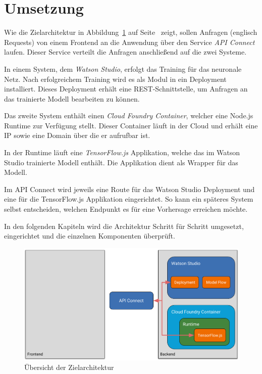 \section{Umsetzung}
Wie die Zielarchitektur in Abbildung~\ref{fig:umsetzung_zielarchitektur} auf
Seite~\pageref{fig:umsetzung_zielarchitektur} zeigt, sollen Anfragen (englisch Requests) von einem Frontend an die
Anwendung über den Service \textit{API Connect} laufen. Dieser Service verteilt die Anfragen anschließend auf die zwei
Systeme.

In einem System, dem \textit{Watson Studio}, erfolgt das Training für das neuronale Netz. Nach erfolgreichem Training
wird es als Modul in ein Deployment installiert. Dieses Deployment erhält eine REST-Schnittstelle, um Anfragen an das
trainierte Modell bearbeiten zu können.

Das zweite System enthält einen \textit{Cloud Foundry Container}, welcher eine Node.js Runtime zur Verfügung stellt.
Dieser Container läuft in der Cloud und erhält eine IP sowie eine Domain über die er aufrufbar ist.

In der Runtime läuft eine \textit{TensorFlow.js} Applikation, welche das im Watson Studio trainierte Modell enthält. Die
Applikation dient als Wrapper für das Modell.

Im API Connect wird jeweils eine Route für das Watson Studio Deployment und eine für die TensorFlow.js Applikation
eingerichtet. So kann ein späteres System selbst entscheiden, welchen Endpunkt es für eine Vorhersage erreichen möchte.

In den folgenden Kapiteln wird die Architektur Schritt für Schritt umgesetzt, eingerichtet und die einzelnen Komponenten
überprüft.

\begin{figure}[h]
    \centering
    \includegraphics[width=\textwidth]{images/kapitel_3/architektur_uebersicht.pdf}
    \caption{Übersicht der Zielarchitektur}
    \label{fig:umsetzung_zielarchitektur}
\end{figure}


